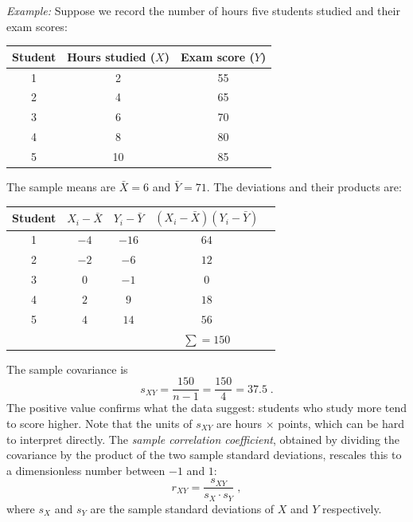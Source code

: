 \medskip

\textit{Example:} Suppose we record the number of hours five students studied and their exam scores:

\medskip

\begin{center}
\begin{tabular}{ccc}
\hline
Student & Hours studied ($X$) & Exam score ($Y$) \\
\hline
1 & 2 & 55 \\
2 & 4 & 65 \\
3 & 6 & 70 \\
4 & 8 & 80 \\
5 & 10 & 85 \\
\hline
\end{tabular}
\end{center}

\medskip

The sample means are $\bar{X} = 6$ and $\bar{Y} = 71$. The deviations and their products are:

\medskip

\begin{center}
\begin{tabular}{ccccc}
\hline
Student & $X_i - \bar{X}$ & $Y_i - \bar{Y}$ & $(X_i-\bar{X})(Y_i-\bar{Y})$ \\
\hline
1 & $-4$ & $-16$ & $64$ \\
2 & $-2$ & $-6$  & $12$ \\
3 & $ 0$ & $-1$  & $0$  \\
4 & $ 2$ & $ 9$  & $18$ \\
5 & $ 4$ & $14$  & $56$ \\
\hline
  &      &       & $\sum = 150$ \\
\hline
\end{tabular}
\end{center}

\medskip

The sample covariance is
\[
    s_{XY} = \frac{150}{n-1} = \frac{150}{4} = 37.5 \; .
\]
The positive value confirms what the data suggest: students who study more tend to score higher. Note that the units of $s_{XY}$ are hours $\times$ points, which can be hard to interpret directly. The \textit{sample correlation coefficient}, obtained by dividing the covariance by the product of the two sample standard deviations, rescales this to a dimensionless number between $-1$ and $1$:
\begin{equation}
    r_{XY} = \frac{s_{XY}}{s_X \cdot s_Y} \; ,
\end{equation}
where $s_X$ and $s_Y$ are the sample standard deviations of $X$ and $Y$ respectively.

